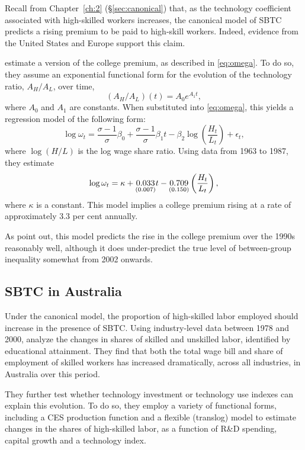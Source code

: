 Recall from Chapter~\ref{ch:2} (\S\ref{sec:canonical}) that, as the technology coefficient associated with high-skilled workers increases, the canonical model of SBTC predicts a rising premium to be paid to high-skill workers. Indeed, evidence from the United States and Europe support this claim.

\citet{Katz1992} estimate a version of the college premium, as described in \eqref{eq:omega}. To do so, they assume an exponential functional form for the evolution of the technology ratio, $A_H/A_L$, over time,
$$  (A_H/A_L)(t) = A_{0}e^{A_1t}, $$
where $A_0$ and $A_1$ are constants. When substituted into \eqref{eq:omega}, this yields a regression model of the following form:
\begin{equation}\label{eq:regcanonical}
\log \omega_t = \frac{\sigma - 1}{\sigma}\beta_0 + \frac{\sigma-1}{\sigma}\beta_1t - \beta_2\log\left(\frac{H_t}{L_t}\right) + \epsilon_t,
\end{equation}
where $\log(H/L)$ is the log wage share ratio. Using data from 1963 to 1987, they estimate
$$
  \log \omega_t = \kappa + \underset{\scriptsize (0.007)}{0.033} t - \underset{\scriptsize (0.150)}{0.709}\left( \frac{H_t}{L_t} \right),
$$
where $\kappa$ is a constant. This model implies a college premium rising at a rate of approximately 3.3 per cent annually.

As \citet{Acemoglu2011} point out, this model predicts the rise in the college premium over the 1990s reasonably well, although it does under-predict the true level of between-group inequality somewhat from 2002 onwards.

\subsection{SBTC in Australia}

Under the canonical model, the proportion of high-skilled labor employed should increase in the presence of SBTC. Using industry-level data between 1978 and 2000, \citet{DeLaine2001} analyze the changes in shares of skilled and unskilled labor, identified by educational attainment. They find that both the total wage bill and share of employment of skilled workers has increased dramatically, across all industries, in Australia over this period.

They further test whether technology investment or technology use indexes can explain this evolution. To do so, they employ a variety of functional forms, including a CES production function and a flexible (translog) model to estimate changes in the shares of high-skilled labor, as a function of R\&D spending, capital growth and a technology index. 

